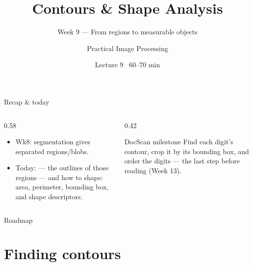 \documentclass[10pt,aspectratio=169]{beamer}
\title{Contours \& Shape Analysis}
\subtitle{Week 9 — From regions to measurable objects}
\author{Practical Image Processing}
\date{Lecture 9 \textbullet\ 60--70 min}
\begin{document}
\maketitle

\begin{frame}{Recap \& today}
  \begin{columns}[T]
    \begin{column}{0.58\textwidth}
      \begin{itemize}
        \item Wk8: segmentation gives separated regions/blobs.
        \item \alert{Today:}  — the outlines of those regions — and how to
               shape: area, perimeter, bounding box, and shape descriptors.
      \end{itemize}
    \end{column}
    \begin{column}{0.42\textwidth}
      \begin{alertblock}{DocScan milestone}
        Find each digit's contour, crop it by its bounding box, and order the digits — the last
        step before reading (Week 13).
      \end{alertblock}
    \end{column}
  \end{columns}
\end{frame}

\begin{frame}{Roadmap}\tableofcontents\end{frame}

\section{Finding contours}
\end{document}
